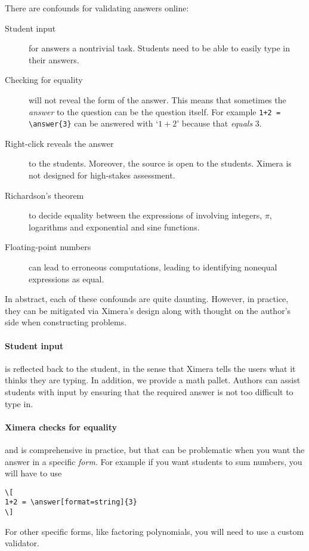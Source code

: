 \documentclass{ximera}
\begin{document}
\begin{warning}
  There are confounds for validating answers online:
  \begin{description}
    \item[Student input] for answers a nontrivial task. Students need to be
      able
      to easily type in their answers.
    \item[Checking for equality] will not reveal the form of the answer. This
      means that sometimes the \textit{answer} to the question can be the
      question
      itself. For example  \verb!1+2 = \answer{3}! can be answered with `$1+2$'
      because
      that \textit{equals} $3$.
    \item[Right-click reveals the answer] to the students. Moreover, the source
      is open to the students. Ximera is not designed for high-stakes
      assessment.
      \item[Richardson's theorem ]
      to decide equality between the expressions of involving integers, $\pi$,
      logarithms and exponential and sine functions.
    \item[Floating-point numbers] can lead to erroneous computations, leading
      to
      identifying nonequal expressions as equal.
  \end{description}
\end{warning}
In abstract, each of these confounds are quite daunting. However, in practice,
they can be mitigated via Ximera's design along with thought on the author's
side when constructing problems.

\paragraph{Student input} is reflected back to the student, in the sense that
Ximera tells the users what it thinks they are typing.
In addition, we provide a math
pallet. Authors can assist students with input by ensuring that the required
answer is not too difficult to type in.

\paragraph{Ximera checks for equality} and is comprehensive in
practice, but that can be problematic when you want the answer in a specific
\textit{form}. For example if you want students to sum numbers, you will have
to use
\begin{verbatim}
\[
1+2 = \answer[format=string]{3}
\]
\end{verbatim}
For other specific forms, like factoring polynomials, you will need to use a
custom validator.
\end{document}
